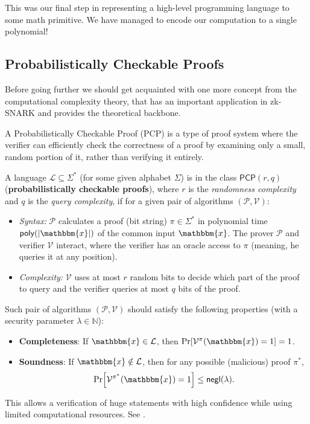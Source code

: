 \documentclass[../../book.tex]{subfiles}
\begin{document}
This was our final step in representing a high-level programming language to some math primitive.
We have managed to encode our computation to a single polynomial!

\subsection{Probabilistically Checkable Proofs}

Before going further we should get acquainted with one more concept from the computational 
complexity theory, that has an important application in zk-SNARK and provides the theoretical 
backbone. 

A Probabilistically Checkable Proof (PCP) is a type of proof system where the verifier can 
efficiently check the correctness of a proof by examining only a small, random portion of it, rather
than verifying it entirely. 
\begin{definition}
    A language $\mathcal{L} \subseteq \Sigma^*$ (for some given alphabet
    $\Sigma$) is in the class $\mathsf{PCP}(r,q)$ (\textbf{probabilistically
    checkable proofs}), where $r$ is the \emph{randomness complexity} and $q$ is
    the \emph{query complexity}, if for a given pair of algorithms
    $(\mathcal{P}, \mathcal{V})$: 
    \begin{itemize}
        \item \emph{Syntax:} $\mathcal{P}$ calculates a proof (bit string) $\pi
        \in \Sigma^*$ in polynomial time $\mathsf{poly}(|\mathbbm{x}|)$ of the
        common input $\mathbbm{x}$. The prover $\mathcal{P}$ and verifier
        $\mathcal{V}$ interact, where the verifier has an oracle access to $\pi$
        (meaning, he queries it at any position).
        \item \emph{Complexity:} $\mathcal{V}$ uses at most $r$ random bits to
        decide which part of the proof to query and the verifier queries at most
        $q$ bits of the proof.
    \end{itemize}
    
    Such pair of algorithms $(\mathcal{P}, \mathcal{V})$ should satisfy the
    following properties (with a security parameter $\lambda \in \mathbb{N}$):
    \begin{itemize}
        \item \textbf{Completeness}: If $\mathbbm{x} \in \mathcal{L}$, then $\Pr[\mathcal{V}^{\pi}(\mathbbm{x}) = 1] = 1$.
        \item \textbf{Soundness}: If $\mathbbm{x} \notin \mathcal{L}$, then for
        any possible (malicious) proof $\pi^*$, 
        \begin{equation*}
            \Pr[\mathcal{V}^{\pi^*}(\mathbbm{x}) = 1] \leq \mathsf{negl}(\lambda).
        \end{equation*}
    \end{itemize}
\end{definition}
This allows a verification of huge statements with high confidence while using
limited computational resources. See .
\end{document}

